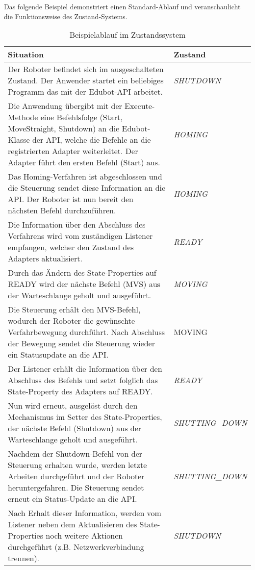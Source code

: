 \newline
Das folgende Beispiel demonstriert einen Standard-Ablauf und veranschaulicht die Funktionsweise des Zustand-Systems.
\newline
\newline
\begin{table}
\begin{tabular}{|p{10cm}|p{4cm}|}
\hline \rowcolor{lightgray} \hline
\textbf{Situation} & \textbf{Zustand}\\
\hline
Der Roboter befindet sich im ausgeschalteten Zustand. Der Anwender startet ein beliebiges Programm das mit der Edubot-API arbeitet. & \textit{SHUTDOWN}\\
\hline
Die Anwendung übergibt mit der Execute-Methode eine Befehlsfolge (Start, MoveStraight, Shutdown) an die Edubot-Klasse der API, welche die Befehle an die registrierten Adapter weiterleitet. Der Adapter führt den ersten Befehl (Start) aus. & \textit{HOMING}\\
\hline
Das Homing-Verfahren ist abgeschlossen und die Steuerung sendet diese Information an die API. Der Roboter ist nun bereit den nächsten Befehl durchzuführen. & \textit{HOMING}\\
\hline
Die Information über den Abschluss des Verfahrens wird vom zuständigen Listener empfangen, welcher den Zustand des Adapters aktualisiert. & \textit{READY}\\
\hline
Durch das Ändern des State-Properties auf READY wird der nächste Befehl (MVS) aus der Warteschlange geholt und ausgeführt. & \textit{MOVING}\\
\hline
Die Steuerung erhält den MVS-Befehl, wodurch der Roboter die gewünschte Verfahrbewegung durchführt. Nach Abschluss der Bewegung sendet die Steuerung wieder ein Statusupdate an die API.	 & MOVING\\
\hline
Der Listener erhält die Information über den Abschluss des Befehls und setzt folglich das State-Property des Adapters auf READY. & \textit{READY}\\
\hline
Nun wird erneut, ausgelöst durch den Mechanismus im Setter des State-Properties, der nächste Befehl (Shutdown) aus der Warteschlange geholt und ausgeführt. & \textit{SHUTTING\_DOWN}\\
\hline
Nachdem der Shutdown-Befehl von der Steuerung erhalten wurde, werden letzte Arbeiten durchgeführt und der Roboter heruntergefahren. Die Steuerung sendet erneut ein Status-Update an die API. & \textit{SHUTTING\_DOWN}\\
\hline
Nach Erhalt dieser Information, werden vom Listener neben dem Aktualisieren des State-Properties noch weitere Aktionen durchgeführt (z.B. Netzwerkverbindung trennen). & \textit{SHUTDOWN}\\
\hline
\end{tabular}
\caption{Beispielablauf im Zustandssystem}
\end{table}